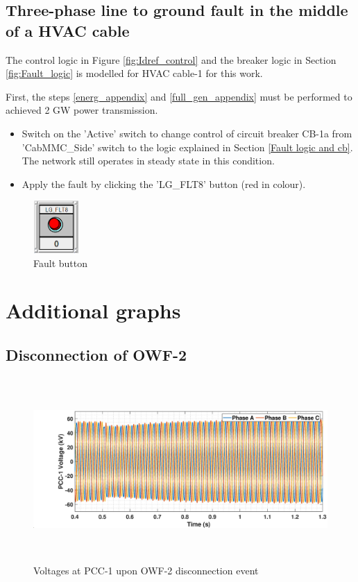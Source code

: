 \subsection{Three-phase line to ground fault in the middle of a HVAC cable}
The control logic in Figure \ref{fig:Idref_control} and the breaker logic in Section \ref{fig:Fault_logic} is modelled for \gls{HVAC} cable-1 for this work. 

First, the steps \ref{energ_appendix} and \ref{full_gen_appendix} must be performed to achieved 2 GW power transmission.

\begin{itemize}
    \item Switch on the 'Active' switch  to change control of circuit breaker CB-1a from 'CabMMC\_Side' switch to the logic explained in Section \ref{Fault logic and cb}. The network still operates in steady state in this condition.
    \item Apply the fault by clicking the 'LG\_FLT8' button (red in colour).
\end{itemize}

\begin{figure}[H]
\centering
    \includegraphics[height = 2cm,width = 1.75cm]{Diagrams/Appendix_C/Fault_button.PNG}
    \caption{Fault button}
    \label{fig:Fault_button}
\end{figure}

\section{Additional graphs}
\subsection{Disconnection of OWF-2}\label{disconn_owf2_appen}

\begin{figure}[H]
    \includegraphics[height = 7cm,width = \textwidth]{Diagrams/Appendix_C/VABC_WT1_WT2off.eps}
    \caption{Voltages at PCC-1 upon OWF-2 disconnection event}
    \label{VABC_WT1_WT2off}
\end{figure}

